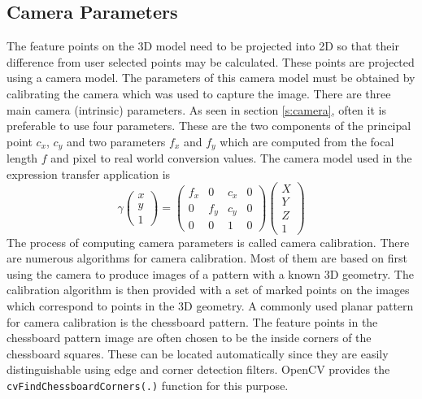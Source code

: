\documentclass[11pt,a4paper]{report}
\begin{document}
\subsection{Camera Parameters}
The feature points on the 3D model need to be projected into 2D so that their
difference from user selected points may be calculated. These points are projected
using a camera model. The parameters of this camera model must be obtained by calibrating the camera which
was used to capture the image. There are three main camera (intrinsic) parameters. As seen in section \ref{s:camera}, often it is preferable to use
four parameters. These are the two components of the principal point $c_x$,
$c_y$ and two parameters $f_x$ and $f_y$ which are computed from the focal
length $f$ and pixel to real world conversion values. The camera model used in
the expression transfer application is
\begin{equation}\label{eq:projective}
\gamma\begin{pmatrix}x\\y\\1\end{pmatrix}
= \begin{pmatrix}f_x&0&c_x&0\\0&f_y&c_y&0\\0&0&1&0\end{pmatrix} \begin{pmatrix}X\\Y\\Z\\1\end{pmatrix}
\end{equation}
The process of computing camera parameters is called camera calibration. There
are numerous algorithms for camera calibration. Most of them are based on first
using the camera to produce images of a pattern with a known 3D geometry. The calibration algorithm is then
provided with a set of marked points on the images which correspond to points in
the 3D geometry. A commonly used planar pattern for camera calibration is
the chessboard pattern. The feature points in the chessboard pattern image are
often chosen to be the inside corners of the chessboard squares. These can
be located automatically since they are easily distinguishable using edge and
corner detection filters. OpenCV provides the
\texttt{cvFindChessboardCorners(.)} function for this purpose.
\end{document}
